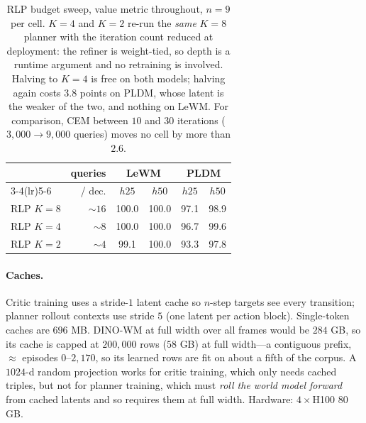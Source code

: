\begin{table}[h]
\centering\small
\caption{RLP budget sweep, value metric throughout, $n{=}9$ per cell. $K{=}4$
and $K{=}2$ re-run the \emph{same} $K{=}8$ planner with the iteration count
reduced at deployment: the refiner is weight-tied, so depth is a runtime
argument and no retraining is involved. Halving to $K{=}4$ is free on both
models; halving again costs $3.8$ points on PLDM, whose latent is the weaker of
the two, and nothing on LeWM. For comparison, CEM between $10$ and $30$
iterations ($3{,}000 \to 9{,}000$ queries) moves no cell by more than $2.6$.}
\begin{tabular}{lrcccc}
\toprule
& queries & \multicolumn{2}{c}{LeWM} & \multicolumn{2}{c}{PLDM} \\
\cmidrule(lr){3-4}\cmidrule(lr){5-6}
 & / dec. & $h25$ & $h50$ & $h25$ & $h50$ \\
\midrule
RLP $K{=}8$ & ${\sim}16$ & 100.0 & 100.0 & 97.1 & 98.9 \\
RLP $K{=}4$ & ${\sim}8$  & 100.0 & 100.0 & 96.7 & 99.6 \\
RLP $K{=}2$ & ${\sim}4$  & 99.1  & 100.0 & 93.3 & 97.8 \\
\bottomrule
\end{tabular}
\end{table}

\paragraph{Caches.}
Critic training uses a stride-$1$ latent cache so $n$-step targets see every
transition; planner rollout contexts use stride $5$ (one latent per action
block). Single-token caches are $696$ MB. DINO-WM at full width over all
frames would be $284$ GB, so its cache is capped at $200{,}000$ rows
($58$ GB) at full width---a contiguous prefix, $\approx$ episodes
$0$--$2{,}170$, so its learned rows are fit on about a fifth of the corpus.
A $1024$-d random projection works for critic training, which only needs
cached triples, but not for planner training, which must \emph{roll the world
model forward} from cached latents and so requires them at full width.
Hardware: $4\times$H100 80 GB.

